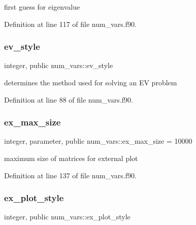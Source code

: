 first guess for eigenvalue 



Definition at line 117 of file num\+\_\+vars.\+f90.

\mbox{\label{namespacenum__vars_aae749d5063afce3b912a097ff0993d00}} 
\subsubsection{\texorpdfstring{ev\+\_\+style}{ev\_style}}
{\footnotesize\ttfamily integer, public num\+\_\+vars\+::ev\+\_\+style}



determines the method used for solving an EV problem 



Definition at line 88 of file num\+\_\+vars.\+f90.

\mbox{\label{namespacenum__vars_a032fd6a1d45689b56362d8aab1cdc57c}} 
\subsubsection{\texorpdfstring{ex\+\_\+max\+\_\+size}{ex\_max\_size}}
{\footnotesize\ttfamily integer, parameter, public num\+\_\+vars\+::ex\+\_\+max\+\_\+size = 10000}



maximum size of matrices for external plot 



Definition at line 137 of file num\+\_\+vars.\+f90.

\mbox{\label{namespacenum__vars_aac52d1fda60883bea62738fe0ecd7527}} 
\subsubsection{\texorpdfstring{ex\+\_\+plot\+\_\+style}{ex\_plot\_style}}
{\footnotesize\ttfamily integer, public num\+\_\+vars\+::ex\+\_\+plot\+\_\+style}




